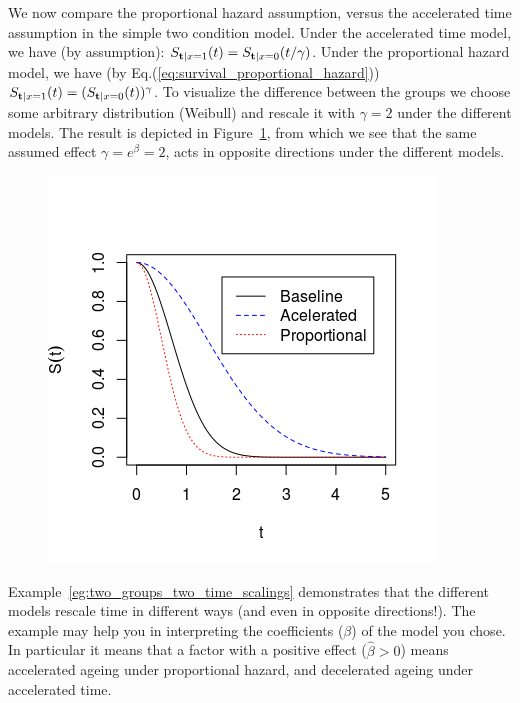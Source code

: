 \begin{example}
\label{eg:two_groups_two_time_scalings}
We now compare the proportional hazard assumption, versus the accelerated time assumption in the simple two condition model. 
Under the accelerated time model, we have (by assumption):
$S_{\mathbf{t}|x=1} (t) = S_{\mathbf{t}|x = 0} (t/\gamma)$. 
Under the proportional hazard model, we have (by Eq.(\ref{eq:survival_proportional_hazard})) 
$	S_{\mathbf{t}|x=1} (t)=(S_{\mathbf{t}|x=0} (t))^{\gamma}$.
To visualize the difference between the groups we choose some arbitrary distribution (Weibull) and rescale it with $\gamma=2$ under the different models. 
The result is depicted in Figure~\ref{fig:time_rescaling}, from which we see that the same assumed effect $\gamma=e^\beta=2$, acts in opposite directions under the different models.

\begin{figure}[ht]
\centering
\includegraphics[height=0.3\textheight]{art/survivals}
\caption{}
\label{fig:time_rescaling}
\end{figure}
\end{example}
Example~\ref{eg:two_groups_two_time_scalings}  demonstrates that the different models rescale time in different ways (and even in opposite directions!). 
The example may help you in interpreting the coefficients ($\beta$) of the model you chose. 
In particular it means that a factor with a positive effect ($\hat{\beta}>0$) means accelerated ageing under proportional hazard, and decelerated ageing under accelerated time.





